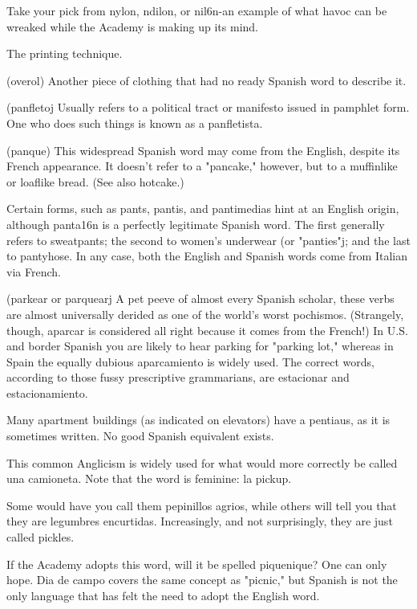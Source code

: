  Take your pick from nylon, ndilon, or nil6n-an example of what havoc can be wreaked while the Academy is making up
its mind.

 The printing technique.

 (overol) Another piece of clothing that had no
ready Spanish word to describe it.

 (panfletoj Usually refers to a political tract or manifesto issued in pamphlet form. One who does such things is known as
a panfletista.

 (panque) This widespread Spanish word may come
from the English, despite its French appearance. It doesn't refer to a
"pancake," however, but to a muffinlike or loaflike bread. (See also
hotcake.)

 Certain forms, such as pants, pantis, and pantimedias hint at an English origin, although panta16n is a perfectly legitimate Spanish word. The first generally refers to sweatpants; the second to women's underwear (or "panties"j; and the last to pantyhose.
In any case, both the English and Spanish words come from Italian via
French.

 (parkear or parquearj A pet peeve of almost every
Spanish scholar, these verbs are almost universally derided as one of
the world's worst pochismos. (Strangely, though, aparcar is considered
all right because it comes from the French!) In U.S. and border Spanish
you are likely to hear parking for "parking lot," whereas in Spain the
equally dubious aparcamiento is widely used. The correct words, according to those fussy prescriptive grammarians, are estacionar and
estacionamiento.

 Many apartment buildings (as indicated on elevators) have a pentiaus, as it is sometimes written. No good Spanish
equivalent exists.

 This common Anglicism is widely used for what
would more correctly be called una camioneta. Note that the word is
feminine: la pickup.

 Some would have you call them pepinillos agrios,
while others will tell you that they are legumbres encurtidas. Increasingly, and not surprisingly, they are just called pickles.

 If the Academy adopts this word, will it be spelled piquenique? One can only hope. Dia de campo covers the same concept
as "picnic," but Spanish is not the only language that has felt the need
to adopt the English word.

